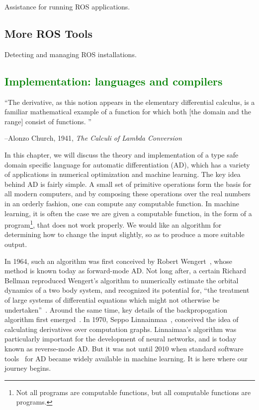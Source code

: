 \documentclass[12pt,initial,twoside,maitrise]{dms}
\newcommand{\mediumwell}[1]{\textcolor{green}{#1}}
\numberwithin{equation}{section}
\numberwithin{table}{chapter}
\numberwithin{figure}{chapter}
\begin{document}
Assistance for running ROS applications.

\section{More ROS Tools}

Detecting and managing ROS installations.

\mediumwell{\chapter{Implementation: languages and compilers}\label{ch:kotlingrad}}

\setlength{\epigraphwidth}{\textwidth}
\epigraph{``The derivative, as this notion appears in the elementary differential calculus, is a familiar mathematical example of a function for which both [the domain and the range] consist of functions.
''}{\begin{flushright}--Alonzo Church, 1941, \textit{The Calculi of Lambda Conversion
~\cite{church1985calculi}}\end{flushright}}

In this chapter, we will discuss the theory and implementation of a type safe domain specific language for automatic differentiation (AD), which has a variety of applications in numerical optimization and machine learning. The key idea behind AD is fairly simple. A small set of primitive operations form the basis for all modern computers, and by composing these operations over the real numbers in an orderly fashion, one can compute any computable function. In machine learning, it is often the case we are given a computable function, in the form of a program\footnote{Not all programs are computable functions, but all computable functions are programs.}, that does not work properly. We would like an algorithm for determining how to change the input slightly, so as to produce a more suitable output.

In 1964, such an algorithm was first conceived by Robert Wengert~\cite{wengert1964simple}, whose method is known today as forward-mode AD. Not long after, a certain Richard Bellman reproduced Wengert's algorithm to numerically estimate the orbital dynamics of a two body system, and recognized its potential for, ``the treatment of large systems of differential equations which might not otherwise be undertaken''~\cite{bellman1965wengert}. Around the same time, key details of the backpropogation algorithm first emerged~\cite{dreyfus1990artificial}. In 1970, Seppo Linnainmaa~\cite{linnainmaa1970representation}, conceived the idea of calculating derivatives over computation graphs. Linnaimaa's algorithm was particularly important for the development of neural networks, and is today known as reverse-mode AD. But it was not until 2010 when standard software tools~\cite{bergstra2010theano, torch} for AD became widely available in machine learning. It is here where our journey begins.
\end{document}
